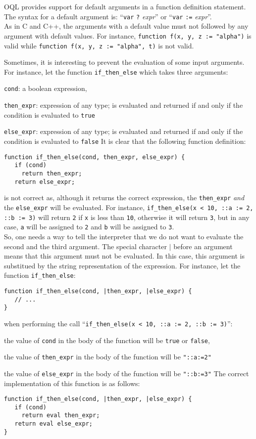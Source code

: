 OQL provides support for default arguments in a function definition
statement.
The syntax for a default argument is: ``\texttt{var} \texttt{?} \emph{expr}''
or ``\texttt{var} \texttt{:=} \emph{expr}''.\\
As in C and C++, the arguments with a default value must not followed
by any argument with default values.
For instance, \texttt{function f(x, y, z := "alpha")} is valid
while \texttt{function f(x, y, z := "alpha", t)} is not valid.

Sometimes, it is interesting to prevent the evaluation of some input
arguments. For instance, let the function \texttt{if\_then\_else} which takes
three arguments:
\be
\item \texttt{cond}: a boolean expression,
\item \texttt{then\_expr}: expression of any type; is evaluated and returned
if and only if the condition is evaluated to \texttt{true}
\item \texttt{else\_expr}: expression of any type; is evaluated and returned
if and only if the condition is evaluated to \texttt{false}
\ee
It is clear that the following function definition:
\begin{verbatim}
function if_then_else(cond, then_expr, else_expr) {
   if (cond)
     return then_expr;
   return else_expr;
\end{verbatim}
is not correct as, although it returns the correct expression,
the \texttt{then\_expr} \emph{and} the \texttt{else\_expr} will be evaluated.
For instance, \texttt{if\_then\_else(x < 10, ::a := 2, ::b := 3)} will
return \texttt{2} if \texttt{x} is less than \texttt{10}, otherwise
it will return \texttt{3}, but in any case, \texttt{a} will be assigned
to \texttt{2} and \texttt{b} will be assigned to \texttt{3}.
\\
So, one needs a way to tell the interpreter that we do not want to evaluate
the second and the third argument. The special character \texttt{$|$}
before an argument means that this argument must not be evaluated.
In this case, this argument is substitued by the string representation of
the expression.
For instance, let the function \texttt{if\_then\_else}:
\begin{verbatim}
function if_then_else(cond, |then_expr, |else_expr) {
   // ...
}
\end{verbatim}
when performing the call ``\texttt{if\_then\_else(x < 10, ::a := 2, ::b := 3)}'':
\be
\item the value of \texttt{cond} in the body of the function will be
\texttt{true} or \texttt{false},
\item the value of \texttt{then\_expr} in the body of the function will be
\texttt{"::a:=2"}
\item the value of \texttt{else\_expr} in the body of the function will be
\texttt{"::b:=3"}
\ee
The correct implementation of this function is as follows:
\begin{verbatim}
function if_then_else(cond, |then_expr, |else_expr) {
   if (cond)
     return eval then_expr;
   return eval else_expr;
}
\end{verbatim}

